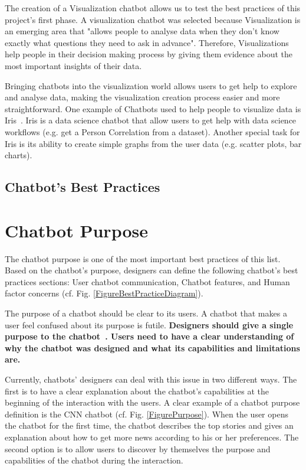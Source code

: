 \documentclass[a4paper,10pt]{article}
\begin{document}
The creation of a Visualization chatbot allows us to test the best practices of this project's first phase. A visualization chatbot was selected because Visualization is an emerging area that "allows people to analyse data when they don't know exactly what questions they need to ask in advance"\cite{munzner2014visualization}. Therefore, Visualizations help people in their decision making process by giving them evidence about the most important insights of their data.

Bringing chatbots into the visualization world allows users to get help to explore and analyse data, making the visualization creation process easier and more straightforward.  One example of Chatbots used to help people to visualize data is Iris~\cite{Iris}. Iris is a data science chatbot that allow users to get help with data science workflows (e.g. get a Person Correlation from a dataset). Another special task for Iris is its ability to create simple graphs from the user data (e.g. scatter plots, bar charts).    




\begin{center}
	\section*{ Chatbot's Best Practices}
\end{center}

\section{Chatbot Purpose}

The chatbot purpose is one of the most important best practices of this list. Based on the chatbot's purpose, designers can define the following chatbot's best practices sections: User chatbot communication, Chatbot features, and Human factor concerns (cf. Fig. \ref{FigureBestPracticeDiagram}).

The purpose of a chatbot should be clear to its users. A chatbot that makes a user feel confused about its purpose is futile. \textbf{Designers should give a single purpose to the chatbot~\cite{ChatbotWord}. Users need to have a clear understanding of why the chatbot was designed and what its capabilities and limitations are.}

Currently, chatbots' designers can deal with this issue in two different ways. The first is to have a clear explanation about the chatbot's capabilities at the beginning of the interaction with the users. A clear example of a chatbot purpose definition is the CNN chatbot (cf. Fig. \ref{FigurePurpose}). When the user opens the chatbot for the first time, the chatbot describes the top stories and gives an explanation about how to get more news according to his or her preferences. The second option is to allow users to discover by themselves the purpose and capabilities of the chatbot during the interaction.
\end{document}
